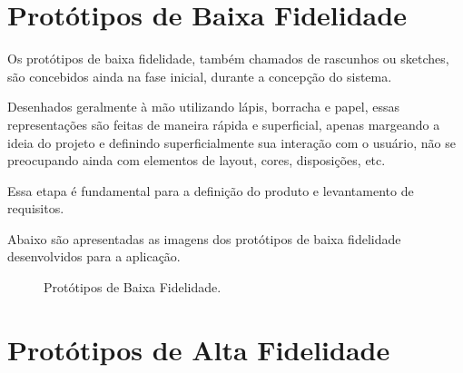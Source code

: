 	\section[Protótipos de Baixa Fidelidade]{Protótipos de Baixa Fidelidade}
	\label{sec:prototipos_baixa}

		Os protótipos de baixa fidelidade, também chamados de rascunhos ou sketches, são concebidos ainda na fase inicial, durante a concepção do sistema.
		
		Desenhados geralmente à mão utilizando lápis, borracha e papel, essas representações são feitas de maneira rápida e superficial, apenas margeando a ideia do projeto e definindo superficialmente sua interação com o usuário, não se preocupando ainda com elementos de layout, cores, disposições, etc.

		Essa etapa é fundamental para a definição do produto e levantamento de requisitos.

		Abaixo são apresentadas as imagens dos protótipos de baixa fidelidade desenvolvidos para a aplicação.

		\newpage
		\begin{landscape}
		\begin{figure}[!htb]
			\centering
			\quad %
			\quad
			\quad
			\quad
			\quad
			\quad
			\quad
			\quad
			\caption{Protótipos de Baixa Fidelidade.}
			\label{fig02}
		\end{figure}
		\end{landscape}


	\section[Protótipos de Alta Fidelidade]{Protótipos de Alta Fidelidade}
	\label{sec:prototipos_alta}

